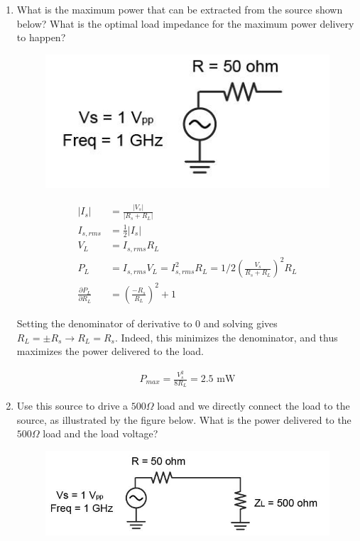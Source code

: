 \documentclass[11pt]{article}
\begin{document}
\begin{enumerate}
	\item What is the maximum power that can be extracted from the source shown below? What is the optimal load impedance for the maximum power delivery to happen?
		\begin{figure}[H]
		\centering \includegraphics[width=\textwidth-10cm]{images/problem3a.jpg}
	\end{figure}
	
	\begin{align*}
		|I_{s}| &= \frac{|V_s|}{|R_s + R_L|} \\
		I_{s,rms} &= \frac{1}{2} |I_{s}| \\
		V_{L} &= I_{s,rms} R_L \\
		P_{L} &= I_{s,rms} V_L = I_{s,rms}^2 R_L = 1/2 (\frac{V_s}{R_s + R_L})^2 R_L \\
		\frac{\partial P_L}{\partial R_L} &= (\frac{-R_s}{R_L})^2 + 1
	\end{align*}
	
	Setting the denominator of derivative to 0 and solving gives $R_L = \pm R_s \rightarrow R_L = R_s$. Indeed, this minimizes the denominator, and thus maximizes the power delivered to the load.
	
	\begin{align*}
		P_{max} = \frac{V_s^2}{8 R_L} = 2.5 \text{ mW}
	\end{align*}
	
	\item Use this source to drive a $500\Omega$ load and we directly connect the load to the source, as illustrated by the figure below. What is the power delivered to the $500 \Omega$ load and the load voltage?
	
	\begin{figure}[H]
		\centering \includegraphics[width=\textwidth-8cm]{images/problem3b.jpg}
	\end{figure}


\end{enumerate}
\end{document}
